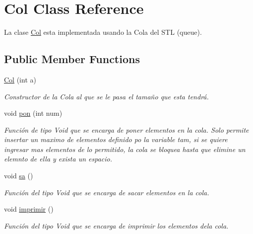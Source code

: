 \hypertarget{classCol}{
\section{Col Class Reference}
\label{classCol}
}


La clase \hyperlink{classCol}{Col} esta implementada usando la Cola del STL (queue).  


\subsection*{Public Member Functions}
\begin{DoxyCompactItemize}
\item 
\hyperlink{classCol_ae7c7afeda66e5dda305cf0a05d770334}{Col} (int a)
\begin{DoxyCompactList}\small\item\em Constructor de la Cola al que se le pasa el tamaño que esta tendrá. \item\end{DoxyCompactList}\item 
void \hyperlink{classCol_af2942105b9353a3fcbd29368cb1dd5dc}{pon} (int num)
\begin{DoxyCompactList}\small\item\em Función de tipo Void que se encarga de poner elementos en la cola. Solo permite insertar un maximo de elementos definido po la variable tam, si se quiere ingresar mas elementos de lo permitido, la cola se bloquea hasta que elimine un elemnto de ella y exista un espacio. \item\end{DoxyCompactList}\item 
void \hyperlink{classCol_a7a07e296cc83a907dfad9c01ecf3ca09}{sa} ()
\begin{DoxyCompactList}\small\item\em Función del tipo Void que se encarga de sacar elementos en la cola. \item\end{DoxyCompactList}\item 
\hypertarget{classCol_a12f9da8f54dc49380f0d05a267bfaee7}{
void \hyperlink{classCol_a12f9da8f54dc49380f0d05a267bfaee7}{imprimir} ()}
\label{classCol_a12f9da8f54dc49380f0d05a267bfaee7}

\begin{DoxyCompactList}\small\item\em Función del tipo Void que se encarga de imprimir los elementos dela cola. \item\end{DoxyCompactList}\end{DoxyCompactItemize}
